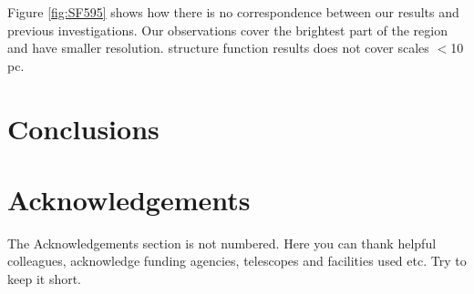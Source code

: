 \documentclass[fleqn,usenatbib]{mnras}
\begin{document}
Figure \ref{fig:SF595} shows how there is no correspondence between our results and previous investigations. Our observations cover the brightest part of the region and have smaller resolution. \citet{lagrois2011} structure function results does not cover scales $<$10 pc.




\section{Conclusions}\label{sec:disc}


\section*{Acknowledgements}

The Acknowledgements section is not numbered. Here you can thank helpful
colleagues, acknowledge funding agencies, telescopes and facilities used etc.
Try to keep it short.






\bsp	%
\label{lastpage}
\end{document}
